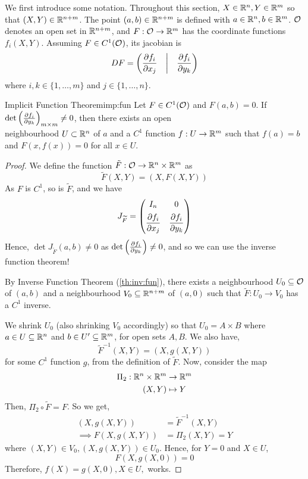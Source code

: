 \documentclass[../Analysis-3.tex]{subfiles}
\begin{document}
We first introduce some notation. Throughout this section, \( X \in \mathbb{R}^n, Y \in \mathbb{R}^m \) so that \( (X,Y) \in \mathbb{R}^{n+m} \). The point \( (a,b) \in \mathbb{R}^{n+m} \) is defined with \( a \in \mathbb{R}^n, b \in \mathbb{R}^m \). \( \mathcal{O}_{} \) denotes an open set in \( \mathbb{R}^{n+m} \), and \( F: \mathcal{O}_{} \to \mathbb{R}^m \) has the coordinate functions \( f_i(X,Y) \). Assuming \( F \in C^1(\mathcal{O}_{}) \), its jacobian is
\[
  DF = \begin{pmatrix}
    \displaystyle\pdv{f_i}{x_j} & \bigg\vert & \displaystyle\pdv{f_i}{y_k}
  \end{pmatrix}
\]
where \( i,k \in \{1,\dots, m\} \) and \( j \in \{1,\dots, n\} \).

\begin{Thm}{Implicit Function Theorem}{imp:fun}
  Let \( F \in C^1(\mathcal{O}_{}) \) and \( F(a,b) = 0 \). If \( \det \left( \pdv{f_i}{y_k}(a,b) \right)_{m \times m} \neq 0 \), then there exists an open \\ neighbourhood \( U \subset \mathbb{R}^n \) of \( a \) and a \( C^1 \) function \( f : U \to \mathbb{R}^m \) such that \( f(a) = b \) and \( F(x,f(x)) = 0 \) for all \( x \in U \).
\end{Thm}
\begin{proof}
  We define the function \( \tilde{F} : \mathcal{O}_{} \to \mathbb{R}^n \times \mathbb{R}^m \) as
  \[
    \widetilde{F}(X,Y) = (X, F(X,Y))
  \]
  As \( F \) is \( C^1 \), so is \( \widetilde{F} \), and we have
  \[
    J_{\widetilde{F}} = \begin{pmatrix}
      I_n                         & 0                           \\[5pt]
      \displaystyle\pdv{f_i}{x_j} & \displaystyle\pdv{f_i}{y_k}
    \end{pmatrix}
  \]
  Hence, \( \det J_{\widetilde{F}}(a,b) \neq 0 \) as \( \det \left( \pdv{f_i}{y_k}(a,b) \right) \neq 0 \), and so we can use the inverse function theorem!

  By Inverse Function Theorem (\ref{th:inv:fun}), there exists a neighbourhood \( U_0 \subseteq \mathcal{O}_{} \) of \( (a,b) \) and a neighbourhood \( V_0 \subseteq \mathbb{R}^{n+m} \) of \( (a,0) \) such that \( \widetilde{F}: U_0 \to V_0 \) has a \( C^1 \) inverse.
  \smallskip

  We shrink \( U_0 \) (also shrinking \( V_0 \) accordingly) so that \( U_0 = A \times B \) where \( a \in U \subseteq \mathbb{R}^n \) and \( b \in U' \subseteq \mathbb{R}^m \), for open sets \( A,B \). We also have,
  \[
    \widetilde{F}^{-1}(X,Y) = (X, g(X,Y))
  \]
  for some \( C^1 \) function \( g \), from the definition of \( \widetilde{F} \). Now, consider the map
  \begin{align*}
    \Pi_2 : \mathbb{R}^n \times \mathbb{R}^m & \to \mathbb{R}^m  \\
    (X,Y)                    & \mapsto Y
  \end{align*}
  Then, \( \Pi_2 \circ \widetilde{F} = F \). So we get,
  \begin{align*}
    (X, g(X,Y))          & = \widetilde{F}^{-1}(X,Y) \\
    \implies F(X,g(X,Y)) & = \Pi_2(X,Y) = Y
  \end{align*}
  where \( (X,Y) \in V_0, (X,g(X,Y)) \in U_0 \). Hence, for \( Y = 0 \) and \( X \in U \),
  \[
    F(X, g(X,0)) = 0
  \]
  Therefore, \( f(X) = g(X, 0), X \in U, \) works.
\end{proof}
\end{document}
